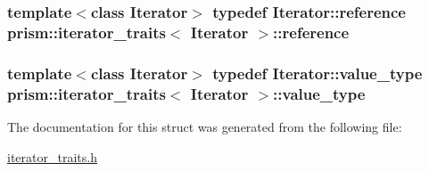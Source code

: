 \subsubsection[{\texorpdfstring{reference}{reference}}]{\setlength{\rightskip}{0pt plus 5cm}template$<$class Iterator$>$ typedef Iterator\+::reference {\bf prism\+::iterator\+\_\+traits}$<$ Iterator $>$\+::{\bf reference}}\hypertarget{structprism_1_1iterator__traits_a18c26ae6eea81bdaeb3bd4e15038eca7}{}\label{structprism_1_1iterator__traits_a18c26ae6eea81bdaeb3bd4e15038eca7}
\subsubsection[{\texorpdfstring{value\+\_\+type}{value_type}}]{\setlength{\rightskip}{0pt plus 5cm}template$<$class Iterator$>$ typedef Iterator\+::value\+\_\+type {\bf prism\+::iterator\+\_\+traits}$<$ Iterator $>$\+::{\bf value\+\_\+type}}\hypertarget{structprism_1_1iterator__traits_a897219622ddfbb1f94aba0cc575cb30c}{}\label{structprism_1_1iterator__traits_a897219622ddfbb1f94aba0cc575cb30c}


The documentation for this struct was generated from the following file\+:\begin{DoxyCompactItemize}
\item 
\hyperlink{iterator__traits_8h}{iterator\+\_\+traits.\+h}\end{DoxyCompactItemize}

